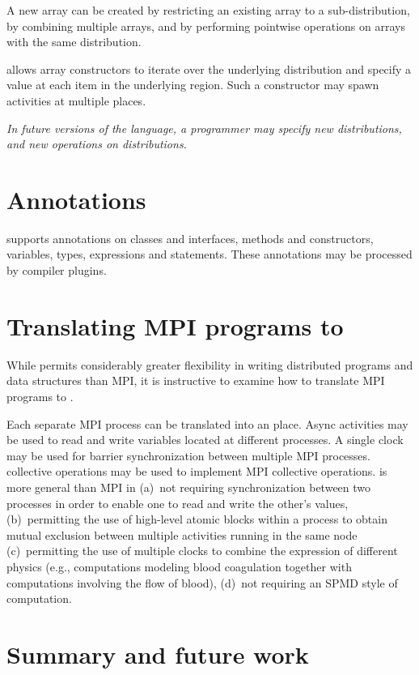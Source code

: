 A new array can be created by restricting an existing array to a
sub-distribution, by combining multiple arrays, and by performing
pointwise operations on arrays with the same distribution.

\Xten{} allows array constructors to iterate over the underlying
distribution and specify a value at each item in the underlying
region. Such a constructor may spawn activities at multiple places.

\emph{In future versions of the language, a programmer may specify new
distributions, and new operations on distributions.}

\section{Annotations}

\Xten{} supports annotations on classes and interfaces, methods
and constructors,
variables, types, expressions and statements.
These annotations may be processed by compiler plugins.

\section{Translating MPI programs to \Xten{}}

While \Xten{} permits considerably greater flexibility in writing
distributed programs and data structures than MPI, it is instructive
to examine how to translate MPI programs to \Xten.

Each separate MPI process can be translated into an \Xten{}
place. Async activities may be used to read and write variables
located at different processes. A single clock may be used for barrier
synchronization between multiple MPI processes. \Xten{} collective
operations may be used to implement MPI collective operations.
\Xten{} is more general than MPI in (a)~not requiring synchronization
between two processes in order to enable one to read and write the
other's values, (b)~permitting the use of high-level atomic blocks
within a process to obtain mutual exclusion between multiple
activities running in the same node (c)~permitting the use of multiple
clocks to combine the expression of different physics (e.g.,
computations modeling blood coagulation together with computations
involving the flow of blood), (d)~not requiring an SPMD style of
computation.


\section{Summary and future work}
